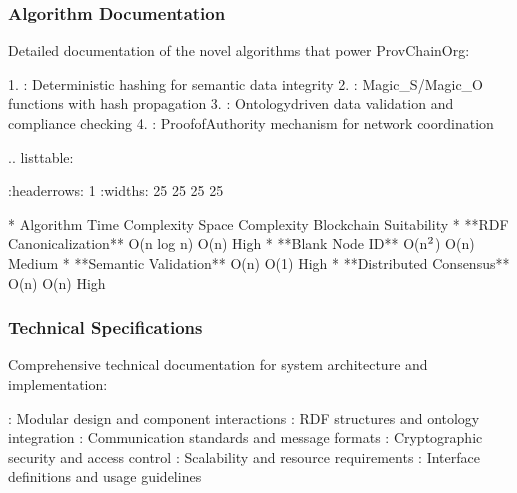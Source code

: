 \documentclass[letterpaper,10pt,english]{sphinxmanual}
\begin{document}
\subsubsection{Algorithm Documentation}
\label{\detokenize{research/index:algorithm-documentation}}
\sphinxAtStartPar
Detailed documentation of the novel algorithms that power ProvChainOrg:

\sphinxAtStartPar
{}
1. : Deterministic hashing for semantic data integrity
2. : Magic\_S/Magic\_O functions with hash propagation
3. : Ontology\sphinxhyphen{}driven data validation and compliance checking
4. : Proof\sphinxhyphen{}of\sphinxhyphen{}Authority mechanism for network coordination

\sphinxAtStartPar
{}
.. list\sphinxhyphen{}table:

\begin{sphinxVerbatim}[commandchars=\\\{\}]
:header\PYGZhy{}rows: 1
:widths: 25 25 25 25

* \PYGZhy{} Algorithm
  \PYGZhy{} Time Complexity
  \PYGZhy{} Space Complexity
  \PYGZhy{} Blockchain Suitability
* \PYGZhy{} **RDF Canonicalization**
  \PYGZhy{} O(n log n)
  \PYGZhy{} O(n)
  \PYGZhy{} High
* \PYGZhy{} **Blank Node ID**
  \PYGZhy{} O(n\(\sp{\text{2}}\))
  \PYGZhy{} O(n)
  \PYGZhy{} Medium
* \PYGZhy{} **Semantic Validation**
  \PYGZhy{} O(n)
  \PYGZhy{} O(1)
  \PYGZhy{} High
* \PYGZhy{} **Distributed Consensus**
  \PYGZhy{} O(n)
  \PYGZhy{} O(n)
  \PYGZhy{} High
\end{sphinxVerbatim}


\subsubsection{Technical Specifications}
\label{\detokenize{research/index:technical-specifications}}
\sphinxAtStartPar
Comprehensive technical documentation for system architecture and implementation:

\sphinxAtStartPar
{}
\sphinxhyphen{} : Modular design and component interactions
\sphinxhyphen{} : RDF structures and ontology integration
\sphinxhyphen{} : Communication standards and message formats
\sphinxhyphen{} : Cryptographic security and access control
\sphinxhyphen{} : Scalability and resource requirements
\sphinxhyphen{} : Interface definitions and usage guidelines
\end{document}
